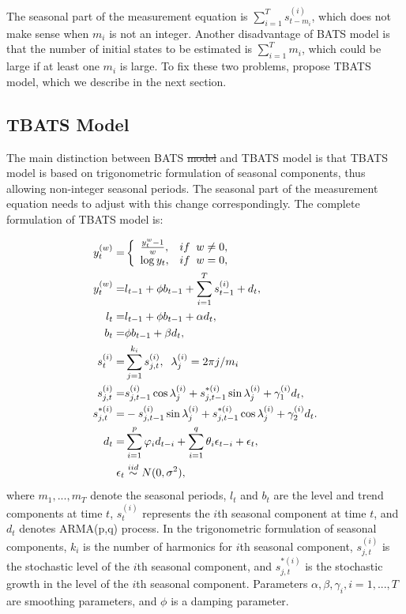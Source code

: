 \documentclass{uwstat572}
\newcommand{\vmdel}[1]{\sout{#1}}
\newcommand{\vmadd}[1]{\textbf{\color{red}{#1}}}
\begin{document}
The seasonal part of the measurement equation is $\sum\limits_{i=1}^T s_{t-m_i}^{(i)}$, which does not make sense when $m_i$ is not an integer. Another disadvantage of BATS model is that the number of initial states to be estimated is $\sum\limits_{i=1}^T m_i$, which could be large if at least one $m_i$ is large. To fix these two problems, \citet{de2011forecasting} propose TBATS model, which we describe in the next section.  

\subsection{TBATS Model}
\hspace{4ex}The main distinction between BATS \vmdel{model} and TBATS model\vmadd{s} is that \vmadd{the} TBATS model is based on trigonometric formulation of seasonal components, thus allowing \vmadd{for} non-integer seasonal periods. 
The seasonal part of the measurement equation needs to adjust with this change correspondingly. The complete formulation of TBATS model is:

\begin{subequations}
\begin{align}
y_t^{  (w)} =& \left\{
\begin{array}{l l}
\frac{y_t^{w}-1}{w}, & if \;\; w \neq 0,\\
\log y_t, & if\;\; w=0,\\
\end{array} \right. \\
y_t^{  (w)}=&l_{t-1}+\phi b_{t-1} +\sum\limits_{i=1}^T s_{t-1}^{(i)}+d_t, \\
l_t=&l_{t-1}+\phi b_{t-1}+\alpha d_t, \\
 b_t=&\phi b_{t-1}+\beta d_t, \\
s_t^{(i)}=&\sum\limits_{j=1}^{k_i} s_{j,t}^{(i)},\;\;  \lambda_{j}^{(i)}=2\pi j /m_i \\
s_{j,t}^{(i)}=&s_{j,t-1}^{(i)} \cos \lambda_j^{(i)} + s_{j,t-1}^{*(i)} \sin \lambda_j^{(i)} +\gamma_1^{(i)}d_t, \\
s_{j,t}^{*(i)}=&-s_{j,t-1}^{(i)} \sin \lambda_j^{(i)} + s_{j,t-1}^{*(i)} \cos \lambda_j^{(i)} +\gamma_2^{(i)}d_t. \\
 d_t=&\sum\limits_{i=1}^p \varphi_id_{t-i} +\sum\limits_{i=1}^q \theta_i \epsilon_{t-i}+\epsilon_t, \\
 \epsilon_t & \stackrel{iid}{\sim} N(0,\sigma^2),
\end{align}
\end{subequations}
\noindent where $m_1,..., m_T$ denote the seasonal periods, $l_t$ and $b_t$ are the level and trend components at time $t$, $s_t^{(i)}$ represents the $i$th seasonal component at time $t$, and $d_t$ denotes ARMA(p,q) process. In the trigonometric formulation of seasonal components, $k_i$ is the number of harmonics for $i$th seasonal component, $s_{j,t}^{(i)}$ is the stochastic level of the $i$th seasonal component, and $s_{j,t}^{*(i)}$ is the stochastic growth in the level of the $i$th seasonal component. Parameters $\alpha, \beta, \gamma_i, i=1,...,T$ are smoothing parameters, and $\phi$ is a damping parameter. 
\end{document}
